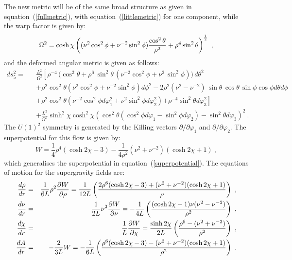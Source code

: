 \documentclass[a4paper,12pt]{article}
\newcommand{\labell}[1]{\label{#1}}
\newcommand{\reef}[1]{(\ref{#1})}
\begin{document}
The new metric will be of the same broad structure as given in
equation~\reef{fullmetric}, with equation~\reef{littlemetric} for one
component, while the warp factor is given by\cite{warnernew}: 
%
\begin{equation}
\Omega^2 =   \cosh\chi 
\left( 
 (\nu^2 \cos^2
  \phi + \nu^{-2} \sin^2 \phi) \frac{\cos^2\theta}{\rho^2} + 
\rho^4 \sin^2\theta\right)^{1 \over 2}\ , 
\labell{warped}
\end{equation}
and the  deformed angular metric is given as follows\cite{warnernew}:
\begin{eqnarray}
ds_5^2 = && \frac{L^2}{\Omega^2}
\left[\rho^{-4} \, \big(\cos^2 \theta + \rho^6\, \sin^2 \theta \,
(\nu^{-2}   \cos^2\phi  +\nu^2\, \sin^2\phi) \big)\, d\theta^2 \right.\nonumber\\
&& + \rho^2\cos^2\theta(\nu^2\cos^2\phi+\nu^{-2}\sin^2\phi)d\phi^2  
-2\rho^2 (\nu^2   - \nu^{-2} ) \,\sin\theta\, \cos \theta\,
\sin\phi\cos \phi d\theta d \phi \nonumber\\
&&+\rho^2\cos^2 \theta  (\nu^{-2}\cos^2\phi  d\varphi_1^2  
+ \nu^2 \sin^2\phi  d\varphi_2^2) \left.
+ \rho^{-4} \sin^2 \theta   d\varphi_3^2 \right]\nonumber\\
&& +  \frac{L^2}{\Omega^6} \sinh^2\chi\cosh^2\chi(\cos^2\theta
 (\cos^2\phi  d\varphi_1 - \sin^2\phi  d\varphi_2)  - 
\sin^2\theta  d\varphi_3)^2\ .
\end{eqnarray}
%
The $U(1)^2$ symmetry is generated by the Killing vectors
$\partial/\partial\varphi_1$ and $\partial/\partial\varphi_2$.
%
The superpotential for this flow is given by\cite{warnernew}:
\begin{equation}
W = \frac{1}{4}\rho^{4}(\cosh 2\chi  - 3) 
- \frac{1}{4 \rho^{2}}(\nu^{2} + \nu^{-2} ) (\cosh 2\chi  +1) \ ,
\end{equation}
which generalises the superpotential in
equation~\reef{superpotential}.  The equations of motion for the
supergravity fields are:
\begin{eqnarray}
{d\rho\over dr}&=&{1\over 6L}\rho^2\frac{\partial W}{\partial\rho}
={1\over 12L}\left({2\rho^6(\cosh 2\chi-3)
+(\nu^2 + \nu^{-2})(\cosh 2\chi+1)\over\rho}\right)\ ,\nonumber \\
{d\nu\over dr}&=&{1\over 2L}\nu^2\frac{\partial W}{\partial\nu}=
-{1 \over 4L}\left({ (\cosh 2\chi+1)\nu(\nu^2 
- \nu^{-2})\over\rho^2}\right)\ ,\nonumber \\
{d\chi\over dr}&=&{1\over L}\frac{\partial W}{\partial\chi}=
{\sinh 2\chi\over 2L}
 \left({\rho^6 - (\nu^2 + \nu^{-2})\over\rho^2}\right)\ ,\nonumber \\ 
{dA\over dr}&=&-{2\over 3L} W
=-{1\over 6L}\left({\rho^6(\cosh 2\chi-3)
-(\nu^2 + \nu^{-2})(\cosh 2\chi+1)\over\rho^2}\right)\ .
\labell{flows2}
\end{eqnarray}
\end{document}
